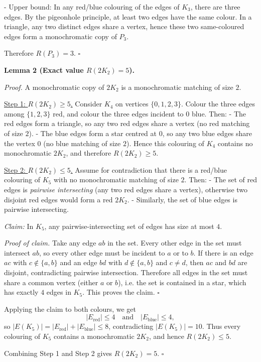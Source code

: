 - Upper bound: In any red/blue colouring of the edges of $K_3$, there are three edges. By the pigeonhole principle, at least two edges have the same colour. In a triangle, any two distinct edges share a vertex, hence these two same-coloured edges form a monochromatic copy of $P_3$.

Therefore $R(P_3)=3$. $\square$

\textbf{Lemma 2 (Exact value $R(2K_2)=5$).}

\emph{Proof.}
A monochromatic copy of $2K_2$ is a monochromatic matching of size $2$.

\underline{Step 1: $R(2K_2)\ge 5$.}
Consider $K_4$ on vertices $\{0,1,2,3\}$. Colour the three edges among $\{1,2,3\}$ red, and colour the three edges incident to $0$ blue. Then:
- The red edges form a triangle, so any two red edges share a vertex (no red matching of size $2$).
- The blue edges form a star centred at $0$, so any two blue edges share the vertex $0$ (no blue matching of size $2$).
Hence this colouring of $K_4$ contains no monochromatic $2K_2$, and therefore $R(2K_2)\ge 5$.

\underline{Step 2: $R(2K_2)\le 5$.}
Assume for contradiction that there is a red/blue colouring of $K_5$ with no monochromatic matching of size $2$.
Then:
- The set of red edges is \emph{pairwise intersecting} (any two red edges share a vertex), otherwise two disjoint red edges would form a red $2K_2$.
- Similarly, the set of blue edges is pairwise intersecting.

\emph{Claim:} In $K_5$, any pairwise-intersecting set of edges has size at most $4$.

\emph{Proof of claim.}
Take any edge $ab$ in the set. Every other edge in the set must intersect $ab$, so every other edge must be incident to $a$ or to $b$.
If there is an edge $ac$ with $c\notin\{a,b\}$ and an edge $bd$ with $d\notin\{a,b\}$ and $c\neq d$, then $ac$ and $bd$ are disjoint, contradicting pairwise intersection. Therefore all edges in the set must share a common vertex (either $a$ or $b$), i.e. the set is contained in a star, which has exactly $4$ edges in $K_5$.
This proves the claim. $\square$

Applying the claim to both colours, we get
\[
|E_{\text{red}}|\le 4 \quad\text{and}\quad |E_{\text{blue}}|\le 4,
\]
so $|E(K_5)|=|E_{\text{red}}|+|E_{\text{blue}}|\le 8$, contradicting $|E(K_5)|=10$.
Thus every colouring of $K_5$ contains a monochromatic $2K_2$, and hence $R(2K_2)\le 5$.

Combining Step 1 and Step 2 gives $R(2K_2)=5$. $\square$

